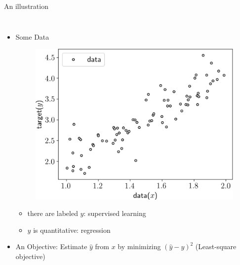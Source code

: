 \documentclass[handout, 10pt]{beamer}
\begin{document}
\begin{frame}{An illustration}
\begin{columns}
\begin{itemize}
    \item Some \alert{Data}
    \begin{figure}
    \includegraphics[width=.8\textwidth]{fig/L1/data-lin.png}
    \end{figure}

    \begin{itemize}
    \item there are labeled $y$: supervised learning
    \item $y$ is quantitative: regression
    \end{itemize}
\pause
\item An \alert{Objective}: Estimate $\hat{y}$ from $x$ by minimizing $(\hat{y}-{y})^2$ (Least-square objective)


\end{itemize}
\end{columns}
\end{frame}
\end{document}
